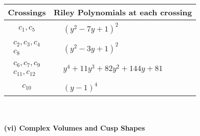 \documentclass[1p]{elsarticle_modified}
\theoremstyle{definition}
\begin{document}
\begin{tabular}{m{50pt}|m{274pt}}
Crossings & \hspace{64pt}Riley Polynomials at each crossing \\
\hline $$\begin{aligned}c_{1},c_{5}\end{aligned}$$&$\begin{aligned}
&(y^2-7 y+1)^2
\end{aligned}$\\
\hline $$\begin{aligned}c_{2},c_{3},c_{4}\\c_{8}\end{aligned}$$&$\begin{aligned}
&(y^2-3 y+1)^2
\end{aligned}$\\
\hline $$\begin{aligned}c_{6},c_{7},c_{9}\\c_{11},c_{12}\end{aligned}$$&$\begin{aligned}
&y^4+11 y^3+82 y^2+144 y+81
\end{aligned}$\\
\hline $$\begin{aligned}c_{10}\end{aligned}$$&$\begin{aligned}
&(y-1)^4
\end{aligned}$\\
\hline
\end{tabular}\\~\\
\newpage\flushleft \textbf{(vi) Complex Volumes and Cusp Shapes}
\end{document}
